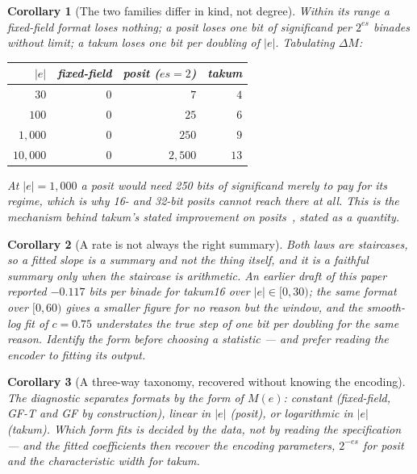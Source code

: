 \documentclass[11pt]{article}
\newtheorem{corollary}{Corollary}
\theoremstyle{definition}
\begin{document}
\begin{corollary}[The two families differ in kind, not degree]
Within its range a fixed-field format loses nothing; a posit loses one bit of
significand per $2^{es}$ binades without limit; a takum loses one bit per
\emph{doubling} of $|e|$. Tabulating $\Delta M$:

\begin{center}
\begin{tabular}{rrrr}
\toprule
$|e|$ & fixed-field & posit ($es{=}2$) & takum \\
\midrule
$30$      & $0$ & $7$    & $4$ \\
$100$     & $0$ & $25$   & $6$ \\
$1{,}000$   & $0$ & $250$  & $9$ \\
$10{,}000$  & $0$ & $2{,}500$ & $13$ \\
\bottomrule
\end{tabular}
\end{center}

At $|e| = 1{,}000$ a posit would need 250 bits of significand merely to pay for
its regime, which is why 16- and 32-bit posits cannot reach there at all. This is
the mechanism behind takum's stated improvement on posits~\cite{takum}, stated as
a quantity.
\end{corollary}

\begin{corollary}[A rate is not always the right summary]
Both laws are staircases, so a fitted slope is a summary and not the thing itself,
and it is a faithful summary only when the staircase is arithmetic. An earlier
draft of this paper reported $-0.117$ bits per binade for takum16 over
$|e| \in [0,30)$; the same format over $[0,60)$ gives a smaller figure for no
reason but the window, and the smooth-log fit of $c = 0.75$ understates the true
step of one bit per doubling for the same reason. Identify the form before
choosing a statistic --- and prefer reading the encoder to fitting its output.
\end{corollary}

\begin{corollary}[A three-way taxonomy, recovered without knowing the encoding]
The diagnostic separates formats by the \emph{form} of $M(e)$: constant
(fixed-field, GF-T and GF by construction), linear in $|e|$ (posit), or
logarithmic in $|e|$ (takum). Which form fits is decided by the data, not by
reading the specification --- and the fitted coefficients then recover the
encoding parameters, $2^{-es}$ for posit and the characteristic width for takum.
\end{corollary}
\end{document}
